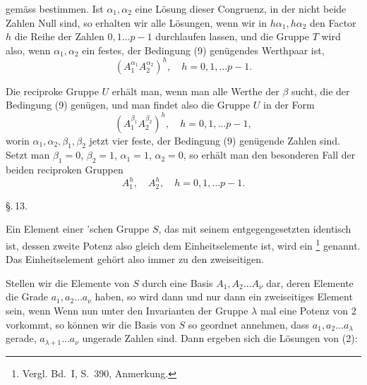 gemäss bestimmen. Ist $\alpha_1, \alpha_2$ eine Lösung dieser
Congruenz, in der nicht beide Zahlen Null sind, so erhalten wir
alle Lösungen, wenn wir in $h\alpha_1, h\alpha_2$ den Factor $h$
die Reihe der Zahlen $0, 1 \dots p-1$ durchlaufen lassen, und die
Gruppe $T$ wird also, wenn $\alpha_1, \alpha_2$ ein festes, der
Bedingung (9) genügendes Werthpaar ist,
\[
(A_1^{\alpha_1}A_2^{\alpha_2})^h, \quad h = 0, 1, \dots p-1.
\]

Die reciproke Gruppe $U$ erhält man, wenn man alle Werthe der
$\beta$ sucht, die der Bedingung (9) genügen, und man findet also
die Gruppe $U$ in der Form
\[
(A_1^{\beta_1}A_2^{\beta_2})^h, \quad h = 0, 1, \dots p-1,
\]
worin $\alpha_1, \alpha_2, \beta_1, \beta_2$ jetzt vier feste, der
Bedingung (9) genügende Zahlen sind. Setzt man $\beta_1 = 0$,
$\beta_2 = 1$, $\alpha_1 = 1$, $\alpha_2 = 0$, so erhält man den
besonderen Fall der beiden reciproken Gruppen
\[
A_1^h, \quad A_2^h, \quad h = 0, 1, \dots p-1.
\]

\begin{center}
\S.\,13.

\end{center}

Ein Element einer 'schen Gruppe $S$, das mit seinem
entgegengesetzten identisch ist, dessen zweite Potenz also gleich
dem Einheitselemente ist, wird ein \footnote{Vergl. Bd.~I, S.~390, Anmerkung.} genannt. Das
Einheitselement gehört also immer zu den zweiseitigen.

Stellen wir die Elemente von $S$ durch eine Basis
$A_1, A_2 \dots A_\nu$ dar, deren Elemente die Grade
$a_1, a_2 \dots a_\nu$ haben, so wird
dann und nur dann ein zweiseitiges Element sein, wenn
Wenn nun unter den Invarianten der Gruppe $\lambda$ mal eine
Potenz von 2 vorkommt, so können wir die Basis von $S$ so
geordnet annehmen, dass $a_1, a_2 \dots a_\lambda$ gerade,
$a_{\lambda+1} \dots a_\nu$ ungerade Zahlen sind. Dann ergeben
sich die Lösungen von (2):
